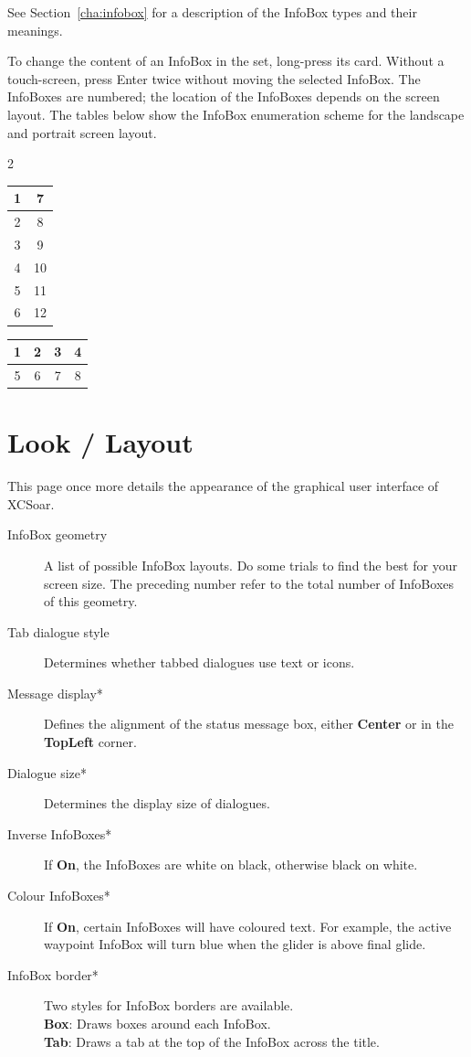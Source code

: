 See Section~\ref{cha:infobox} for a description of the InfoBox types and their meanings.

To change the content of an InfoBox in the set, long-press its card.
Without a touch-screen, press Enter twice without moving the selected
InfoBox.
The InfoBoxes are numbered; the location of the InfoBoxes depends on the screen layout.  
The tables below show the InfoBox enumeration scheme for the
landscape and portrait screen layout.

\begin{multicols}{2}
\begin{tabular}{|c|c|}
\hline
1 & 7 \\
\hline
2 & 8 \\
\hline
3 & 9 \\
\hline
4 & 10 \\
\hline
5 & 11 \\
\hline
6 & 12 \\
\hline
\end{tabular}

\begin{tabular}{|c|c|c|c|}
\hline
1 & 2 & 3 & 4 \\
\hline
\hline
5 & 6 & 7 & 8 \\
\hline
\end{tabular}
\end{multicols}


\section{Look / Layout}\label{sec:interface-appearance}
\label{conf:interface-appearance}

This page once more details the appearance of the graphical user interface of XCSoar.

\begin{description}
\item[InfoBox geometry]  A list of possible InfoBox layouts. Do some trials to find the 
  best for your screen size. The preceding number refer to the total number of 
  InfoBoxes of this geometry.
\item[Tab dialogue style]  Determines whether tabbed dialogues use text or icons.
\item[Message display*]  Defines the alignment of the status message box, either 
  {\bf Center} or in the {\bf TopLeft} corner.
\item[Dialogue size*]  Determines the display size of dialogues.
\item[Inverse InfoBoxes*]  If {\bf On}, the InfoBoxes are white on black, otherwise 
  black on white.
\item[Colour InfoBoxes*]  If {\bf On}, certain InfoBoxes will have coloured text. For 
  example, the active waypoint InfoBox will turn blue when the glider is above final 
  glide.
\item[InfoBox border*]  Two styles for InfoBox borders are available. \\
  {\bf Box}: Draws boxes around each InfoBox. \\
  {\bf Tab}: Draws a tab at the top of the InfoBox across the
  title. \\
\end{description}



